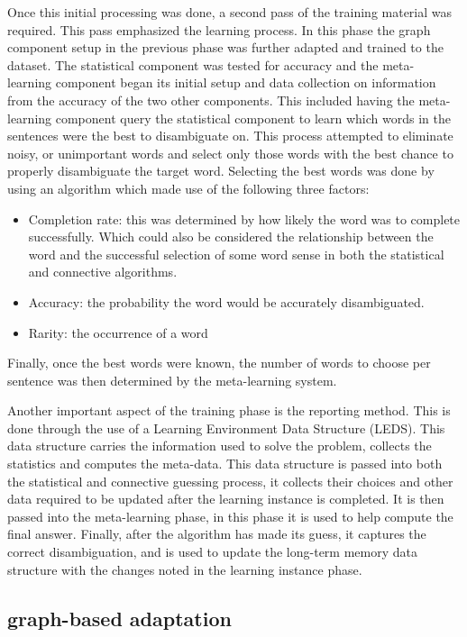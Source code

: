 Once this initial processing was done, a second pass of the training material
was required.  This pass emphasized the learning process.  In this phase the
graph component setup in the previous phase was further adapted and trained to
the dataset.  The statistical component was tested for accuracy and the meta-
learning component began its initial setup and data collection on information
from the accuracy of the two other components. This included having the meta-
learning component query the statistical component to learn which words in the
sentences were the best to disambiguate on. This process attempted to eliminate
noisy, or unimportant words and select only those words with the best chance to
properly disambiguate the target word.  Selecting the best words was done by
using an algorithm which made use of the following three factors:

\begin{itemize}
	\item Completion rate: this was determined by how likely the
word was to complete successfully. Which could also be considered the
relationship between the word and the successful selection of some word sense in
both the statistical and connective algorithms.      
	\item Accuracy: the probability the word would be accurately disambiguated.     
	\item Rarity: the occurrence of a word 
\end{itemize}

Finally, once the best words were known, the number of words to choose per
sentence was then determined by the meta-learning system.

Another important aspect of the training phase is the reporting method.  This is
done through the use of a Learning Environment Data Structure (LEDS).  This data
structure carries the information used to solve the problem, collects the
statistics and computes the meta-data. This data structure is passed into both
the statistical and connective guessing process, it collects their choices and
other data required to be updated after the learning instance is completed.  It
is then passed into the meta-learning phase, in this phase it is used to help
compute the final answer. Finally, after the algorithm has made its guess, it
captures the correct disambiguation, and is used to update the long-term memory
data structure with the changes noted in the learning instance phase.

\subsection{graph-based adaptation}

